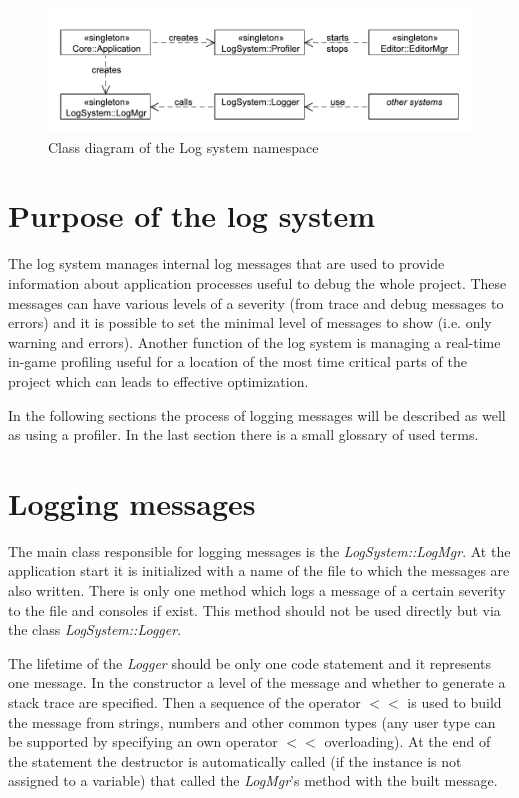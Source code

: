 \documentclass[a4paper, 12pt]{report}
\begin{document}
\begin{figure}[htbp]
	\centering
		\includegraphics[width=1\textwidth]{LogSystemClassDiagram.pdf}
	\caption{Class diagram of the Log system namespace}
	\label{fig:logsystem-diagram}
\end{figure}

\section{Purpose of the log system}

The log system manages internal log messages that are used to provide information about application processes useful to debug the whole project. These messages can have various levels of a severity (from trace and debug messages to errors) and it is possible to set the minimal level of messages to show (i.e. only warning and errors). Another function of the log system is managing a real-time in-game profiling useful for a location of the most time critical parts of the project which can leads to effective optimization.

In the following sections the process of logging messages will be described as well as using a profiler. In the last section there is a small glossary of used terms.

\section{Logging messages}
\label{sec:logging}

The main class responsible for logging messages is the \emph{LogSystem::LogMgr}. At the application start it is initialized with a name of the file to which the messages are also written. There is only one method which logs a message of a certain severity to the file and consoles if exist. This method should not be used directly but via the class \emph{LogSystem::Logger}.

The lifetime of the \emph{Logger} should be only one code statement and it represents one message. In the constructor a level of the message and whether to generate a stack trace are specified. Then a sequence of the operator $<<$ is used to build the message from strings, numbers and other common types (any user type can be supported by specifying an own operator $<<$ overloading). At the end of the statement the destructor is automatically called (if the instance is not assigned to a variable) that called the \emph{LogMgr}'s method with the built message.
\end{document}
